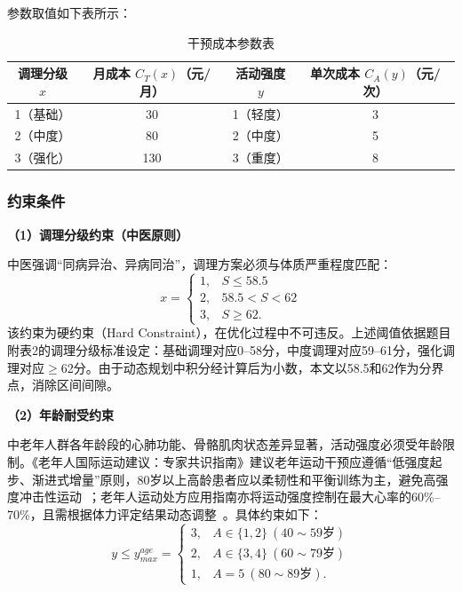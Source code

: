 \documentclass[a4paper,12pt]{ctexart}
\begin{document}
参数取值如下表所示：
\begin{table}[H]
\centering
\caption{干预成本参数表}
\label{tab:cost}
\begin{tabular}{cccc}
\toprule
\textbf{调理分级} $x$ & \textbf{月成本} $C_T(x)$（元/月） & \textbf{活动强度} $y$ & \textbf{单次成本} $C_A(y)$（元/次） \\
\midrule
1（基础） & 30 & 1（轻度） & 3 \\
2（中度） & 80 & 2（中度） & 5 \\
3（强化） & 130 & 3（重度） & 8 \\
\bottomrule
\end{tabular}
\end{table}

\subsubsection{约束条件}
\textbf{（1）调理分级约束（中医原则）}

中医强调``同病异治、异病同治''，调理方案必须与体质严重程度匹配：
\begin{equation}
x =
\begin{cases}
1, & S \leq 58.5 \\
2, & 58.5 < S < 62 \\
3, & S \geq 62.
\end{cases}
\end{equation}
该约束为硬约束（Hard Constraint），在优化过程中不可违反。上述阈值依据题目附表2的调理分级标准设定：基础调理对应0--58分，中度调理对应59--61分，强化调理对应$\geq$62分。由于动态规划中积分经计算后为小数，本文以58.5和62作为分界点，消除区间间隙。

\textbf{（2）年龄耐受约束}

中老年人群各年龄段的心肺功能、骨骼肌肉状态差异显著，活动强度必须受年龄限制。《老年人国际运动建议：专家共识指南》建议老年运动干预应遵循``低强度起步、渐进式增量''原则，80岁以上高龄患者应以柔韧性和平衡训练为主，避免高强度冲击性运动~\cite{wu2022exercise}；老年人运动处方应用指南亦将运动强度控制在最大心率的60\%--70\%，且需根据体力评定结果动态调整~\cite{wu1994exercise}。具体约束如下：
\begin{equation}
y \leq y_{max}^{age} =
\begin{cases}
3, & A\in\{1,2\}\ (40\sim59\text{岁}) \\
2, & A\in\{3,4\}\ (60\sim79\text{岁}) \\
1, & A=5\ (80\sim89\text{岁}).
\end{cases}
\end{equation}
\end{document}
